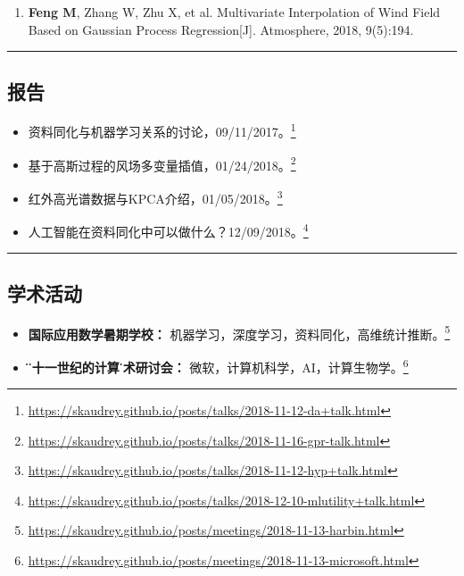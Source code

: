 \documentclass[10pt,letterpaper]{article}
\begin{document}
\begin{enumerate}
	\parskip=0.1em
	
	\item \textbf{Feng M}, Zhang W, Zhu X, et al. Multivariate Interpolation of Wind Field Based on Gaussian Process Regression[J]. Atmosphere, 2018, 9(5):194.
	
%	

\end{enumerate}

\hrule
\vspace{-0.4em}
\subsection*{报告}

\begin{itemize}
	\parskip=0.1em
	
	\item 资料同化与机器学习关系的讨论，09/11/2017。\footnote{\url{https://skaudrey.github.io/posts/talks/2018-11-12-da+talk.html}}

	\item 基于高斯过程的风场多变量插值，01/24/2018。\footnote{\url{https://skaudrey.github.io/posts/talks/2018-11-16-gpr-talk.html}}
	
	\item 红外高光谱数据与KPCA介绍，01/05/2018。\footnote{\url{https://skaudrey.github.io/posts/talks/2018-11-12-hyp+talk.html}}

	\item 人工智能在资料同化中可以做什么？12/09/2018。\footnote{\url{https://skaudrey.github.io/posts/talks/2018-12-10-mlutility+talk.html}}
	
\end{itemize}

\hrule
\vspace{-0.4em}
\subsection*{学术活动}

\begin{itemize}
	\parskip=0.1em
	
	\item \textbf{国际应用数学暑期学校：} 机器学习，深度学习，资料同化，高维统计推断。\footnote{\url{https://skaudrey.github.io/posts/meetings/2018-11-13-harbin.html}}
	
	\item \textbf{\"二十一世纪的计算\"学术研讨会：} 微软，计算机科学，AI，计算生物学。\footnote{\url{https://skaudrey.github.io/posts/meetings/2018-11-13-microsoft.html}}

\end{itemize}
\end{document}
